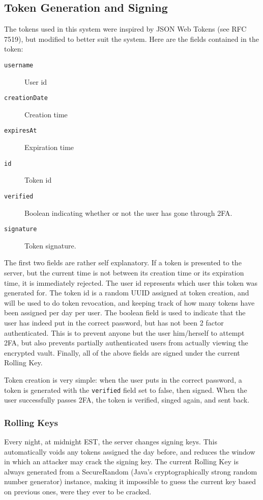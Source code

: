\documentclass{article}
\begin{document}
\subsection{Token Generation and Signing}
\label{sub:token_generation_and_signing}
\par The tokens used in this system were inspired by JSON Web Tokens (see RFC 7519\cite{bib:RFC7519}), but modified to better suit the system. Here are the fields contained in the token:
\begin{description}
  \item[\texttt{username}] User id
  \item[\texttt{creationDate}] Creation time
  \item[\texttt{expiresAt}] Expiration time
  \item[\texttt{id}] Token id
  \item[\texttt{verified}] Boolean indicating whether or not the user has gone through 2FA.
  \item[\texttt{signature}] Token signature.
\end{description}
\par The first two fields are rather self explanatory. If a token is presented to the server, but the current time is not between its creation time or its expiration time, it is immediately rejected. The user id represents which user this token was generated for. The token id is a random UUID assigned at token creation, and will be used to do token revocation, and keeping track of how many tokens have been assigned per day per user. The boolean field is used to indicate that the user has indeed put in the correct password, but has not been 2 factor authenticated. This is to prevent anyone but the user him/herself to attempt 2FA, but also prevents partially authenticated users from actually viewing the encrypted vault. Finally, all of the above fields are signed under the current Rolling Key.
\par Token creation is very simple: when the user puts in the correct password, a token is generated with the \texttt{verified} field set to false, then signed. When the user successfully passes 2FA, the token is verified, singed again, and sent back.

\subsubsection{Rolling Keys}
\label{ssub:rolling_keys}
\par Every night, at midnight EST, the server changes signing keys. This automatically voids any tokens assigned the day before, and reduces the window in which an attacker may crack the signing key. The current Rolling Key is always generated from a SecureRandom (Java's cryptographically strong random number generator) instance, making it impossible to guess the current key based on previous ones, were they ever to be cracked.
\end{document}
